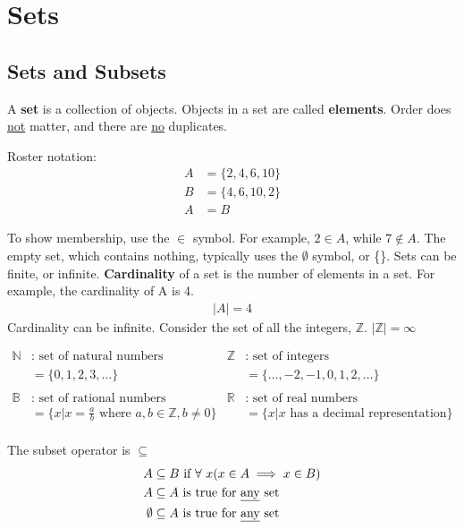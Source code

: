 \section{Sets}
\subsection{Sets and Subsets}

A \textbf{set} is a collection of objects. Objects in a set are called \textbf{elements}.
Order does \underline{not} matter, and there are \underline{no} duplicates.

Roster notation:
\begin{align*}
  A & = \{2, 4, 6, 10\} \\
  B & = \{4, 6, 10, 2\} \\
  A & = B
\end{align*}

To show membership, use the $\in$ symbol. For example, $2 \in A$, while $7 \not \in A$.
The empty set, which contains nothing, typically uses the $\emptyset$ symbol, or \{\}.
Sets can be finite, or infinite. \textbf{Cardinality} of a set is the number of elements in a set.
For example, the cardinality of A is 4.
\begin{align*}
  \left\lvert A\right\rvert = 4
\end{align*}
Cardinality can be infinite. Consider the set of all the integers, $\mathbb{Z}$. $\left\lvert \mathbb{Z}\right\rvert = \infty$

\begin{align*}
  \mathbb{N} & : \text{ set of natural numbers}                                         & \mathbb{Z} & : \text{ set of integers}                        \\
             & = \{0, 1, 2, 3, \ldots\}                                                 &            & = \{\ldots, -2, -1, 0, 1, 2, \ldots\}            \\
  \\
  \mathbb{B} & : \text{ set of rational numbers}                                        & \mathbb{R} & : \text{ set of real numbers}                    \\
             & = \{x | x = \frac{a}{b} \text{ where } a, b \in \mathbb{Z}, b \not = 0\} &            & = \{x | x \text{ has a decimal representation}\} \\
\end{align*}

The subset operator is $\subseteq$
\begin{align*}
  A         & \subseteq B \text{  if } \forall~ x (x \in A \implies x \in B) \\
  A         & \subseteq A \text{  is true for \underline{any} set}          \\
  \emptyset & \subseteq A \text{ is true for \underline{any} set}
\end{align*}

